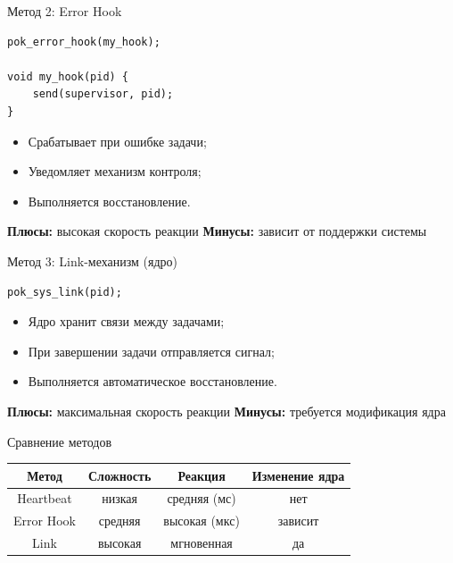 \begin{frame}[fragile]{Метод 2: Error Hook}
\begin{verbatim}
pok_error_hook(my_hook);

void my_hook(pid) {
    send(supervisor, pid);
}
\end{verbatim}

\vspace{0.5em}
\begin{itemize}
    \item Срабатывает при ошибке задачи;
    \item Уведомляет механизм контроля;
    \item Выполняется восстановление.
\end{itemize}

\vspace{0.5em}
\textbf{Плюсы:} высокая скорость реакции  
\textbf{Минусы:} зависит от поддержки системы
\end{frame}

\begin{frame}[fragile]{Метод 3: Link-механизм (ядро)}
\begin{verbatim}
pok_sys_link(pid);
\end{verbatim}

\vspace{0.5em}
\begin{itemize}
    \item Ядро хранит связи между задачами;
    \item При завершении задачи отправляется сигнал;
    \item Выполняется автоматическое восстановление.
\end{itemize}

\vspace{0.5em}
\textbf{Плюсы:} максимальная скорость реакции  
\textbf{Минусы:} требуется модификация ядра
\end{frame}

\begin{frame}{Сравнение методов}
\begin{center}
\begin{tabular}{|c|c|c|c|}
\hline
\textbf{Метод} & \textbf{Сложность} & \textbf{Реакция} & \textbf{Изменение ядра} \\
\hline
Heartbeat & низкая & средняя (мс) & нет \\
\hline
Error Hook & средняя & высокая (мкс) & зависит \\
\hline
Link & высокая & мгновенная & да \\
\hline
\end{tabular}
\end{center}

\vspace{0.8em}
\end{frame}
